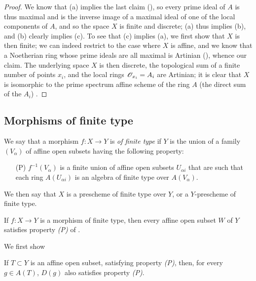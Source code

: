 \begin{proof}
We know that (a) implies the last claim (\cite[p.~205, th.~3]{I-13}), so every prime ideal of $A$ is thus maximal and is the inverse image of a maximal ideal of one of the local components of $A$, and so the space $X$ is finite and discrete;
(a) thus implies (b), and (b) clearly implies (c).
To see that (c) implies (a), we first show that $X$ is then finite;
we can indeed restrict to the case where $X$ is affine, and we know that a Noetherian ring whose prime ideals are all maximal is Artinian (\cite[p.~203]{I-13}), whence our claim.
The underlying space $X$ is then discrete, the topological sum of a finite number of points $x_i$, and the local rings $\mathscr{O}_{x_i}=A_i$ are Artinian;
it is clear that $X$ is isomorphic to the prime spectrum affine scheme of the ring $A$ (the direct sum of the $A_i$) .
\end{proof}

\subsection{Morphisms of finite type}
\label{subsection:I.6.3}

\begin{definition}[6.3.1]
\label{I.6.3.1}
We say that a morphism $f:X\to Y$ is \emph{of finite type} if $Y$ is the union of a family $(V_\alpha)$ of affine open subsets having the following property:
\begin{enumerate}
  \item[(P)] $f^{-1}(V_\alpha)$ is a finite union of affine open subsets $U_{\alpha i}$ that are such that each ring $A(U_{\alpha i})$ is an algebra of finite type over $A(V_\alpha)$.
\end{enumerate}
We then say that $X$ is a prescheme of finite type over $Y$, or a $Y$-prescheme of finite type.
\end{definition}

\begin{proposition}[6.3.2]
\label{I.6.3.2}
If $f:X\to Y$ is a morphism of finite type, then every affine open subset $W$ of $Y$ satisfies property \emph{(P)} of .
\end{proposition}

We first show
\begin{lemma}[6.3.2.1]
\label{I.6.3.2.1}
If $T\subset Y$ is an affine open subset, satisfying property \emph{(P)}, then, for every $g\in A(T)$, $D(g)$ also satisfies property \emph{(P)}.
\end{lemma}

